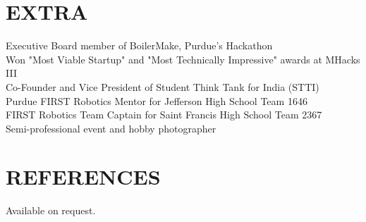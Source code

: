 \documentclass[margin,5pt]{res} %
\begin{document}
\begin{resume}
\section{EXTRA}       
	Executive Board member of BoilerMake, Purdue's Hackathon\\
	Won "Most Viable Startup" and "Most Technically Impressive" awards at MHacks III\\
	Co-Founder and Vice President of Student Think Tank for India (STTI) \\
        Purdue FIRST Robotics Mentor for Jefferson High School Team 1646\\
	FIRST Robotics Team Captain for Saint Francis High School Team 2367\\
        Semi-professional event and hobby photographer

 \section{REFERENCES}Available on request.


\end{resume}
\end{document}
